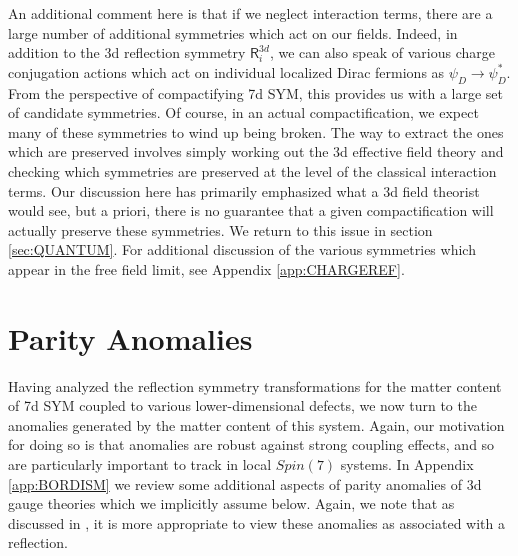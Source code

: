 \documentclass[12pt]{article}%
\numberwithin{equation}{section}
\renewcommand{\(}{\left(}
\renewcommand{\)}{\right)}
\renewcommand{\[}{\left[}
\renewcommand{\]}{\right]}
\begin{document}
An additional comment here is that if we neglect interaction terms, there are a large number of additional symmetries which act on our fields.
Indeed, in addition to the 3d reflection symmetry $\mathsf{R}_{i}^{3d}$, we can also speak of various charge conjugation actions which act on individual localized Dirac fermions as $\psi_{D} \rightarrow \psi_{D}^{\ast}$. From the perspective of compactifying 7d SYM, this provides us with a large set of candidate symmetries. Of course, in an actual compactification, we expect many of these symmetries to wind up being broken. The way to extract the ones which are preserved involves simply working out the 3d effective field theory and checking which symmetries are preserved at the level of the classical interaction terms. Our discussion here has primarily emphasized what a 3d field theorist would see, but a priori, there is no guarantee that a given compactification will actually preserve these symmetries. We return to this issue in section \ref{sec:QUANTUM}. For additional discussion of the various symmetries which appear in the free field limit, see Appendix \ref{app:CHARGEREF}.


\section{Parity Anomalies\label{sec:ANOMO}}

Having analyzed the reflection symmetry transformations for the matter content of 7d SYM coupled to various lower-dimensional defects,
we now turn to the anomalies generated by the matter content of this system. Again, our motivation for doing so is that
anomalies are robust against strong coupling effects, and so are particularly important to track in local $Spin(7)$ systems.
In Appendix \ref{app:BORDISM} we review some additional aspects of parity
anomalies of 3d gauge theories which we implicitly assume below. Again, we note that as discussed in \cite{Witten:2016cio}, it is
more appropriate to view these anomalies as associated with a reflection.
\end{document}
